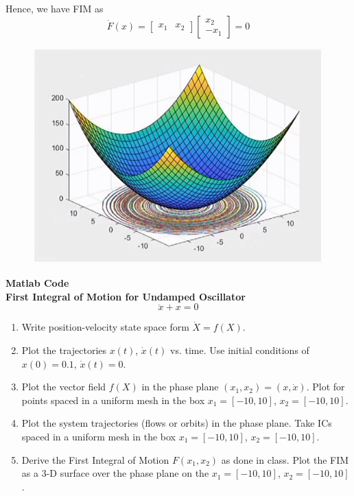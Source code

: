 \documentclass{homeworg}
\begin{document}
Hence, we have FIM as
\begin{equation*}
  \dot{F}(x) =
  \begin{bmatrix}
    x_1 & x_2
  \end{bmatrix}
  \begin{bmatrix}
    x_2 \\
    -x_1
  \end{bmatrix}
  = 0
\end{equation*}
\begin{figure}[h]
  \includegraphics[width=.45\textwidth]{fig04.png}
  \centering
\end{figure}

\newpage
\noindent
\textbf{Matlab Code}\\




\exercise
\noindent
\textbf{First Integral of Motion for Undamped Oscillator}\\
\begin{equation*}
\ddot{x} + x = 0
\end{equation*}

\begin{enumerate}[label=(\alph*)]
  \item Write position-velocity state space form \(\dot{X} = f(X)\).
  \item Plot the trajectories \(x(t)\), \(\dot{x}(t)\) vs. time. Use initial conditions of \(x(0)=0.1\), \(\dot{x}(t)=0\).
  \item Plot the vector field \(f(X)\) in the phase plane \((x_1, x_2)=(x, \dot{x})\). Plot for points spaced in a uniform mesh in the box \(x_1=[-10,10]\), \(x_2=[-10,10]\).
  \item Plot the system trajectories (flows or orbits) in the phase plane. Take ICs spaced in a uniform mesh in the box \(x_1=[-10,10]\), \(x_2=[-10,10]\).
  \item Derive the First Integral of Motion \(F(x_1,x_2)\) as done in class. Plot the FIM as a 3-D surface over the phase plane on the \(x_1=[-10,10]\), \(x_2=[-10,10]\).
\end{enumerate}
\end{document}
